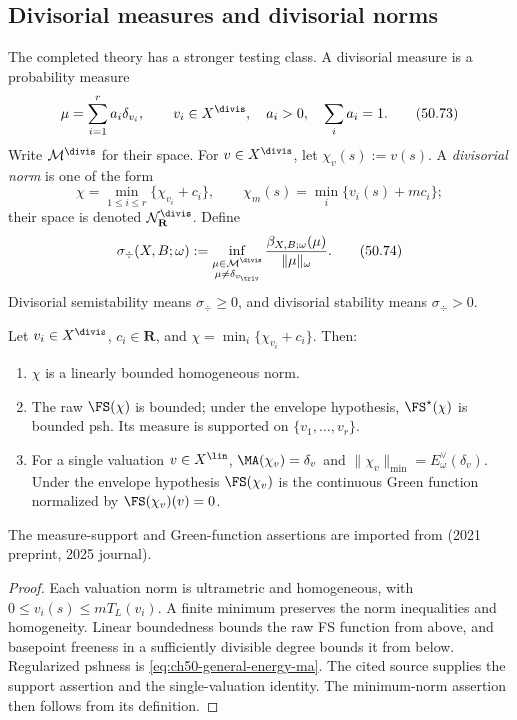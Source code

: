 \subsection{Divisorial measures and divisorial norms}
\label{sec:ch50-divisorial}

The completed theory has a stronger testing class.  A divisorial measure is
a probability measure
\[
             \mu=\sum_{i=1}^r a_i\delta_{v_i},
\qquad
 v_i\in X^{\divis},\quad a_i>0,\quad\sum_i a_i=1.
\tag{50.73}\label{eq:stability-divisorial-measure}
\]
Write $\mathcal M^{\divis}$ for their space.  For
$v\in X^{\divis}$, let $\chi_v(s):=v(s)$.  A \emph{divisorial norm}
is one of the form
\[
       \chi=\min_{1\leq i\leq r}\{\chi_{v_i}+c_i\},
       \qquad
       \chi_m(s)=\min_i\{v_i(s)+mc_i\};
\]
their space is denoted $\mathcal N_{\mathbf R}^{\divis}$.  Define
\[
 \sigma_{\div}(X,B;\omega)
 :=\inf_{\substack{\mu\in\mathcal M^{\divis}\\
                    \mu\ne\delta_{v_{\triv}}}}
       \frac{\beta_{X,B;\omega}(\mu)}{\|\mu\|_\omega}.
\tag{50.74}\label{eq:stability-divisorial-threshold}
\]
Divisorial semistability means $\sigma_{\div}\geq0$, and divisorial
stability means $\sigma_{\div}>0$.

\begin{lemma}
\label{lem:ch50-divisorial-norms}
Let $v_i\in X^{\divis}$, $c_i\in\mathbf R$, and
$\chi=\min_i\{\chi_{v_i}+c_i\}$.  Then:
\begin{enumerate}
\item\label{itm:ch50-dn:norm}
      $\chi$ is a linearly bounded homogeneous norm.
\item\label{itm:ch50-dn:fs}
      The raw $\FS(\chi)$ is bounded; under the envelope hypothesis,
      $\FS^\star(\chi)$ is bounded psh.  Its measure is supported on
      $\{v_1,\ldots,v_r\}$.
\item\label{itm:ch50-dn:trivial}
      For a single valuation $v\in X^{\lin}$,
      $\MA(\chi_v)=\delta_v$ and
      $\|\chi_v\|_{\min}=E^\vee_\omega(\delta_v)$.
      Under the envelope hypothesis $\FS(\chi_v)$ is the continuous
      Green function normalized by $\FS(\chi_v)(v)=0$.
\end{enumerate}
The measure-support and Green-function assertions are imported from
\cite[Theorem~7.13 and Example~7.14]{BJKS1} (2021 preprint, 2025 journal).
\end{lemma}

\begin{proof}
Each valuation norm is ultrametric and homogeneous, with
$0\le v_i(s)\le mT_L(v_i)$.  A finite minimum preserves the norm
inequalities and homogeneity.  Linear boundedness bounds the raw FS
function from above, and basepoint freeness in a sufficiently divisible
degree bounds it from below.  Regularized pshness is
\eqref{eq:ch50-general-energy-ma}.  The cited source supplies the support
assertion and the single-valuation identity.  The minimum-norm assertion
then follows from its definition.
\end{proof}

